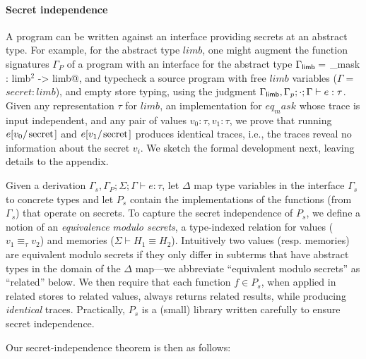 \paragraph{Secret independence}
A \lamstar program can be written against an interface providing
secrets at an abstract type.
%
For example, for the abstract type \lst$limb$, one might augment the
function signatures $\Gamma_P$ of a program with an interface for the
abstract type $\Gamma_{\text{\textsf{limb}}} =$
%
\lst@eq_mask : limb$^2$ -> limb@, and typecheck a source program
with free \lst$limb$ variables ($\Gamma =$ \lst$secret:limb$),
and empty store typing, using the judgment
%
$\Gamma_{\text{\textsf{limb}}}, \Gamma_p; \cdot; \Gamma \vdash e : \tau$.
%
Given any representation $\tau$ for \lst$limb$, an implementation for
\lst$eq_mask$ whose trace is input independent, and any pair of values
$v_0:\tau, v_1:\tau$, we prove that running $e[v_0/\text{\lst{secret}}]$ and $e[v_1/\text{\lst{secret}}]$
produces identical traces, i.e., the traces reveal no information
about the secret $v_i$. We sketch the formal development next, leaving
details to the appendix.

Given a derivation
%
$\Gamma_s, \Gamma_P; \Sigma; \Gamma \vdash e : \tau$, let $\Delta$ map
type variables in the interface $\Gamma_s$ to concrete types and let $P_s$ contain
the implementations of the functions (from $\Gamma_s$) that operate on
secrets.
%
To capture the secret independence of $P_s$, we define a notion of an
\emph{equivalence modulo secrets}, a type-indexed relation for values
($v_1 \equiv_{\tau} v_2$) and memories ($\Sigma \vdash H_1 \equiv
H_2$). Intuitively two values (resp. memories) are equivalent modulo
secrets if they only differ in subterms that have abstract types in
the domain of the $\Delta$ map---we abbreviate ``equivalent modulo
secrets'' as ``related'' below.
%
We then require that each function $f \in P_s$, when applied in
related stores to related values, always returns related results, while
producing \emph{identical} traces.
%
Practically, $P_s$ is a (small) library written carefully to ensure
secret independence.

Our secret-independence theorem is then as follows:

